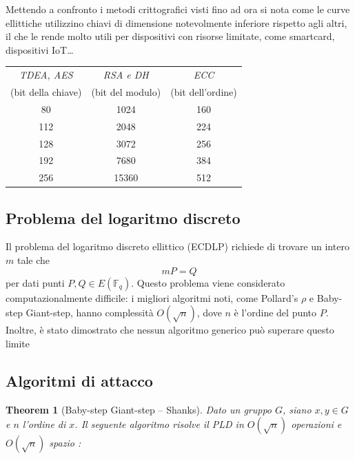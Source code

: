 \documentclass[12pt, a4paper]{report}
\newtheorem{theorem}{Theorem}[section]
\begin{document}
Mettendo a confronto i metodi crittografici visti fino ad ora si nota come le curve ellittiche utilizzino chiavi di dimensione notevolmente inferiore rispetto agli altri, il che le rende molto utili per dispositivi con risorse limitate, come smartcard, dispositivi IoT\dots

\begin{center}
    \begin{tabular}{|c|c|c|}
        \hline
        \textit{TDEA, AES} & \textit{RSA e DH} & \textit{ECC}\\
        (bit della chiave) & (bit del modulo) & (bit dell'ordine)\\
        \hline
        80 & 1024 & 160 \\
        112 & 2048 & 224 \\
        128 & 3072 & 256 \\
        192 & 7680 & 384 \\
        256 & 15360 & 512 \\
        \hline
    \end{tabular}
\end{center}

\subsection{Problema del logaritmo discreto}
\label{sec:logaritmo_discreto}
Il problema del logaritmo discreto ellittico (ECDLP) richiede di trovare 
un intero $m$ tale che
\begin{equation}
    mP = Q
\end{equation}
per dati punti $P, Q \in E(\mathbb{F}_q)$.
Questo problema viene considerato computazionalmente difficile: 
i migliori algoritmi noti, come Pollard's $\rho$ e Baby-step Giant-step, 
hanno complessità $O(\sqrt{n})$, dove $n$ è l'ordine del punto $P$. 
Inoltre, è stato dimostrato che nessun algoritmo generico può 
superare questo limite \cite{silverman}

\subsection{Algoritmi di attacco}
\begin{theorem}[Baby-step Giant-step -- Shanks]
    Dato un gruppo $G$, siano $x, y \in G$ e $n$ l'ordine di $x$. 
    Il seguente algoritmo risolve il PLD in $O(\sqrt{n})$ operazioni 
    e $O(\sqrt{n})$ spazio \cite{silverman}:
\end{theorem}
\end{document}
